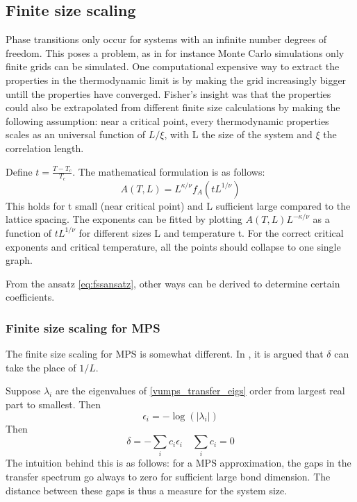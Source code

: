 \subsection{Finite size scaling}\label{subsec:fss}

Phase transitions only occur for systems with an infinite number degrees of freedom. This poses a problem, as in for instance Monte Carlo simulations only finite grids can be simulated. One computational expensive way to extract the properties in the thermodynamic limit is by making the grid increasingly bigger untill the properties have converged. Fisher's insight was that the properties could also be extrapolated from different finite size calculations by making the following assumption: near a critical point, every thermodynamic properties scales as an universal function of $L/\xi$, with L the size of the system and $\xi$ the correlation length.

Define $t=\frac{T-T_c}{T_c}$. The mathematical formulation is as follows:
\begin{equation}\label{eq:fssansatz}
    A(T,L) = L^{\kappa / \nu} f_A( t L ^{1/ \nu} )
\end{equation}
This holds for t small (near critical point) and L sufficient large compared to the lattice spacing. The exponents can be fitted by plotting $A(T,L)  L^{-\kappa / \nu} $ as a function of $t L ^{1/ \nu}$ for different sizes L and temperature t. For the correct critical exponents and critical temperature, all the points should collapse to one single graph.

From the ansatz \cref{eq:fssansatz}, other ways can be derived to determine certain coefficients.

\subsubsection{Finite size scaling for MPS}

The finite size scaling for MPS is somewhat different. In \cite{Vanhecke2019}, it is argued that $\delta$ can take the place of $1/L$.

Suppose $\lambda_i$ are the eigenvalues of \cref{vumps_transfer_eigs} order from largest real part to smallest. Then
\begin{equation}
    \epsilon_i = - \log( \left | \lambda_i  \right |  )
\end{equation}
Then
\begin{equation} \label{eq:cit_delta}
    \delta = - \sum_i c_i \epsilon_i  \quad \sum_i c_i = 0
\end{equation}
The intuition behind this is as follows: for a MPS approximation, the gaps in the transfer spectrum go always to zero for sufficient large bond dimension. The distance between these gaps is thus a measure for the system size.

